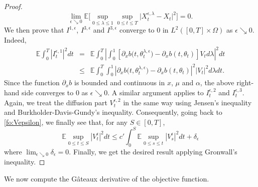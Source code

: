 \documentclass[11pt]{amsart}
\begin{document}
\begin{proof}
\begin{equation*}
\lim_{\epsilon \searrow 0} {\mathbb E} \bigl[ \sup_{0 \leq \lambda \leq 1}  \sup_{0 \le t \le T} \bigl\vert X_{t}^{\epsilon,\lambda}
- X_{t} \bigr\vert^2 \bigr] = 0. 
\end{equation*}
We then prove that $I^{1,\epsilon}$, $I^{3,\epsilon}$ and $I^{3,\epsilon}$ converge to $0$ in $L^2([0,T]\times\Omega)$ as $\epsilon\searrow 0$. Indeed, 
\begin{eqnarray*}
{\mathbb E}\int_0^T|I^{\epsilon,1}_t|^2dt&=&{\mathbb E}\int_0^T\left|\int_0^1[\partial_xb\bigl(t,\theta^{\lambda,\epsilon}_t \bigr)-\partial_x b(t,\theta_t)]V_t d\lambda
\right|^2dt
\\
&\le&{\mathbb E}\int_0^T\int_0^1|\partial_xb \bigl(t,\theta_{t}^{\lambda,\epsilon} \bigr)-\partial_x b(t,\theta_{t})|^2|V_t|^2 d\lambda dt.
\end{eqnarray*} 
Since the function $\partial_{x} b$ is bounded and continuous in $x$, $\mu$ and $\alpha$, the above right-hand side converges to $0$ as $\epsilon\searrow 0$. A similar argument applies to $I^{\epsilon,2}_{t}$ and $I^{\epsilon,3}_{t}$. Again, we treat the diffusion part $V^{\epsilon,2}_t$  in the same way using Jensen's inequality and Burkholder-Davis-Gundy's inequality.  Consequently, going back to \eqref{fo:Vepsilon}, we finally see that, for any $S \in [0,T]$,
\begin{equation*}
{\mathbb E}\sup_{0\le t\le S}|V^\epsilon_t|^2dt 
\le c' \int_0^S{\mathbb E}\sup_{0\le s\le t}|V^\epsilon_s|^2 dt+\delta_\epsilon
\end{equation*} 
where $\lim_{\epsilon\searrow 0}\delta_\epsilon=0$.
Finally, we get the desired result applying Gronwall's inequality.
\end{proof}

\vskip 2pt\noindent
We now compute the G\^ateaux derivative of the objective function. 
\end{document}
